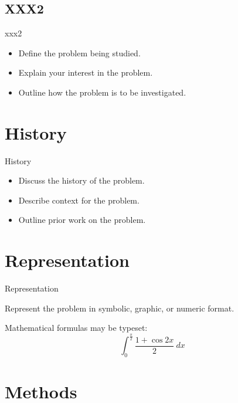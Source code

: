 \documentclass{beamer}
\begin{document}
\subsection{XXX2}
\begin{frame}{xxx2}

\begin{itemize}
\item Define the problem being studied.
\item Explain your interest in the problem.
\item Outline how the problem is to be investigated.
\end{itemize}

\end{frame}

\section{History}

\begin{frame}{History}

\begin{itemize}
\item Discuss the history of the problem.
\item Describe context for the problem.
\item Outline prior work on the problem.
\end{itemize}

\end{frame}



\section{Representation}

\begin{frame}{Representation}

Represent the problem in symbolic, graphic, or numeric format.

\bigskip

Mathematical formulas may be typeset:
\[ \int_0^\frac{\pi}{2}\frac{1+\cos 2x}{2} \: dx \]

\end{frame}



\section{Methods}
\end{document}
